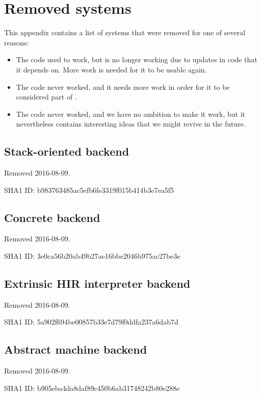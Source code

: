\chapter{Removed systems}

This appendix contains a list of systems that were removed for one of
several reasons:

\begin{itemize}
\item The code used to work, but is no longer working due to updates
  in code that it depends on.  More work is needed for it to be usable
  again.
\item The code never worked, and it needs more work in order for it to
  be considered part of \sysname{}.
\item The code never worked, and we have no ambition to make it work,
  but it nevertheless contains interesting ideas that we might revive
  in the future.
\end{itemize}

\section{Stack-oriented \clanguage{} backend}

Removed 2016-08-09.

SHA1 ID: b983763485ac5efb6fe3319f015b414b3e7ea5f5

\section{Concrete \commonlisp{} backend}

Removed 2016-08-09.

SHA1 ID: 3e0ca56b20ab49b27ae16bbe2046b975ac27be3e

\section{Extrinsic HIR interpreter backend}

Removed 2016-08-09.

SHA1 ID: 5a902f694be00857b33e7d79f0ddfa237a6dab7d

\section{Abstract machine backend}

Removed 2016-08-09.

SHA1 ID: b905eba4da8daf89c450b6ab31748242b80e288e
